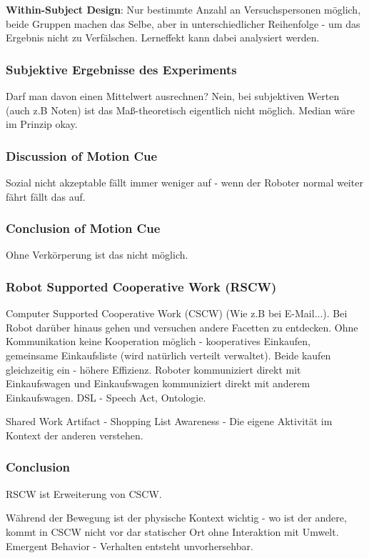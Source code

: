 \textbf{Within-Subject Design}: Nur bestimmte Anzahl an Versuchspersonen möglich,
beide Gruppen machen das Selbe, aber in unterschiedlicher Reihenfolge - um das Ergebnis
nicht zu Verfälschen. Lerneffekt kann dabei analysiert werden.

\subsubsection{Subjektive Ergebnisse des Experiments}
Darf man davon einen Mittelwert ausrechnen? Nein, bei subjektiven Werten (auch z.B Noten)
ist das Maß-theoretisch eigentlich nicht möglich. 
Median wäre im Prinzip okay.

\subsubsection{Discussion of Motion Cue}
Sozial nicht akzeptable fällt immer weniger auf - wenn der Roboter normal weiter fährt
fällt das auf. 
\subsubsection{Conclusion of Motion Cue}
Ohne Verkörperung ist das nicht möglich. 

\subsubsection{Robot Supported Cooperative Work (RSCW)}
Computer Supported Cooperative Work (CSCW) (Wie z.B bei E-Mail...).
Bei Robot darüber hinaus gehen und versuchen andere Facetten zu entdecken. 
Ohne Kommunikation keine Kooperation möglich - kooperatives Einkaufen, gemeinsame
Einkaufsliste (wird natürlich verteilt verwaltet). Beide kaufen gleichzeitig ein -
höhere Effizienz. 
Roboter kommuniziert direkt mit Einkaufswagen und Einkaufswagen kommuniziert direkt mit
anderem Einkaufswagen. DSL - Speech Act, Ontologie.

Shared Work Artifact - Shopping List
Awareness - Die eigene Aktivität im Kontext der anderen verstehen.

\subsubsection{Conclusion}

RSCW ist Erweiterung von CSCW.

Während der Bewegung ist der physische Kontext wichtig - wo ist der andere, kommt in CSCW
nicht vor dar statischer Ort ohne Interaktion mit Umwelt.
Emergent Behavior - Verhalten entsteht unvorhersehbar.

